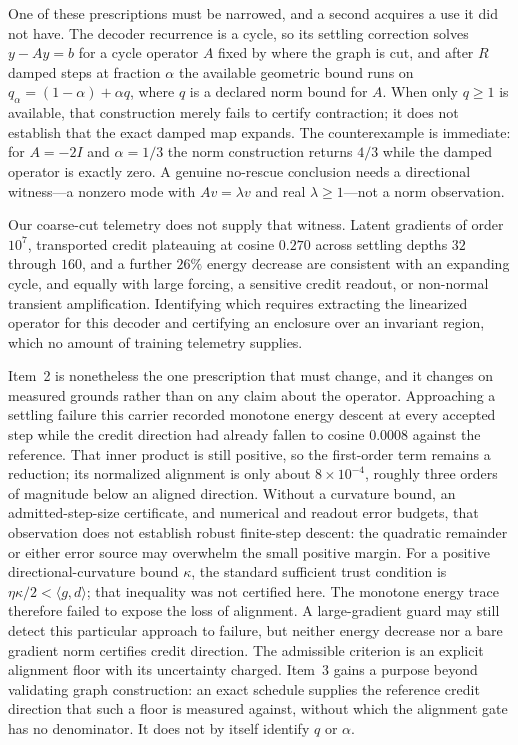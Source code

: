 \documentclass[11pt]{article}
\begin{document}
One of these prescriptions must be narrowed, and a second acquires a use it did not have.
The decoder recurrence is a cycle, so its settling correction solves $y-Ay=b$ for a cycle
operator $A$ fixed by where the graph is cut, and after $R$ damped steps at fraction
$\alpha$ the available geometric bound runs on $q_\alpha=(1-\alpha)+\alpha q$, where $q$
is a declared norm bound for $A$.  When only $q\ge1$ is available, that construction
merely fails to certify contraction; it does not establish that the exact damped map
expands.  The counterexample is immediate: for $A=-2I$ and $\alpha=1/3$ the norm
construction returns $4/3$ while the damped operator is exactly zero.  A genuine
no-rescue conclusion needs a directional witness---a nonzero mode with $Av=\lambda v$ and
real $\lambda\ge1$---not a norm observation.

Our coarse-cut telemetry does not supply that witness.  Latent gradients of order
$10^{7}$, transported credit plateauing at cosine $0.270$ across settling depths $32$
through $160$, and a further $26\%$ energy decrease are consistent with an expanding
cycle, and equally with large forcing, a sensitive credit readout, or non-normal
transient amplification.  Identifying which requires extracting the linearized operator
for this decoder and certifying an enclosure over an invariant region, which no amount of
training telemetry supplies.

Item~2 is nonetheless the one prescription that must change, and it changes on measured
grounds rather than on any claim about the operator.  Approaching a settling failure this
carrier recorded monotone energy descent at every accepted step while the credit direction
had already fallen to cosine $0.0008$ against the reference.  That inner product is still
positive, so the first-order term remains a reduction; its normalized alignment is only
about $8\times10^{-4}$, roughly three orders of magnitude below an aligned direction.
Without a curvature bound, an admitted-step-size certificate, and numerical and readout
error budgets, that observation does not establish robust finite-step descent: the
quadratic remainder or either error source may overwhelm the small positive margin.  For
a positive directional-curvature bound $\kappa$, the standard sufficient trust condition
is $\eta\kappa/2<\langle g,d\rangle$; that inequality was not certified here.  The
monotone energy trace therefore failed to expose the loss of alignment.  A large-gradient
guard may still detect this particular approach to failure, but neither energy decrease
nor a bare gradient norm certifies credit direction.  The admissible criterion is an
explicit alignment floor with its uncertainty charged.  Item~3 gains a purpose beyond
validating graph construction: an exact schedule
supplies the reference credit direction that such a floor is measured against, without
which the alignment gate has no denominator.  It does not by itself identify $q$ or
$\alpha$.
\end{document}
